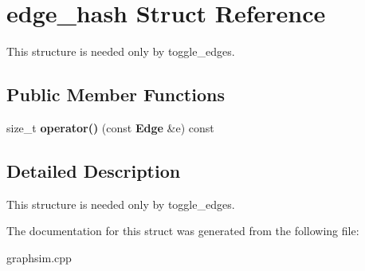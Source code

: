 \section{edge\_\-hash Struct Reference}
\label{structedge__hash}
This structure is needed only by toggle\_\-edges.  


\subsection*{Public Member Functions}
\begin{CompactItemize}
\item 
size\_\-t {\bf operator()} (const  {\bf Edge} \&e) const \label{structedge__hash_a0}

\end{CompactItemize}


\subsection{Detailed Description}
This structure is needed only by toggle\_\-edges. 



The documentation for this struct was generated from the following file:\begin{CompactItemize}
\item 
graphsim.cpp\end{CompactItemize}
